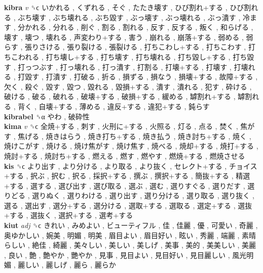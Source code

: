 \textbf{kibra} \emph{v}  ␝ϲ   いかれる ,  くずれる ,  そぐ ,  たたき壊す ,  ひび割れ+する ,  ひび割れる ,  ぶち壊す ,  ぶち壊れる ,  ぶち毀す ,  ぶっ壊す ,  ぶっ壊れる ,  ぶっ潰す ,  冷ます ,  分かれる ,  分れる ,  削ぐ ,  割る ,  割れる ,  反す ,  反する ,  叛く ,  和らげる ,  壊す ,  壊つ ,  壊れる ,  声変わり+する ,  害う ,  崩れる ,  崩落+する ,  弱める ,  弱らす ,  張りさける ,  張り裂ける ,  張裂ける ,  打ちこわし+する ,  打ちこわす ,  打ちこわれる ,  打ち壊し+する ,  打ち壊す ,  打ち壊れる ,  打ち毀し+する ,  打ち毀す ,  打っつぶす ,  打っ壊れる ,  打っ潰す ,  打割る ,  打壊+する ,  打壊す ,  打壊れる ,  打毀す ,  打潰す ,  打破る ,  折る ,  損ずる ,  損なう ,  損壊+する ,  故障+する ,  欠く ,  殺ぐ ,  毀す ,  毀つ ,  毀れる ,  毀損+する ,  潰す ,  潰れる ,  犯す ,  砕ける ,  破ける ,  破る ,  破れる ,  破壊+する ,  破損+する ,  緩める ,  罅割れ+する ,  罅割れる ,  背く ,  自壊+する ,  薄める ,  違反+する ,  違犯+する ,  鈍らす   \\
\textbf{kibrabel} ␝α   やわ ,  破砕性   \\
\textbf{kima} \emph{v}  ␝ϲ   全焼+する ,  刺す ,  火刑に+する ,  火照る ,  灯る ,  点る ,  焚く ,  焦がす ,  焦げる ,  焼きはらう ,  焼き打ち+する ,  焼き払う ,  焼き討ち+する ,  焼く ,  焼けこがす ,  焼ける ,  焼け焦がす ,  焼け焦す ,  焼べる ,  焼却+する ,  焼打+する ,  焼討+する ,  焼討ち+する ,  燃える ,  燃す ,  燃やす ,  燃焼+する ,  燃焼させる   \\
\textbf{kis} ␝ϲ   より出す ,  より分ける ,  より取る ,  より抜く ,  セレクト+する ,  チョイス+する ,  択ぶ ,  択む ,  択る ,  採択+する ,  撰ぶ ,  撰択+する ,  簡抜+する ,  精選+する ,  選する ,  選び出す ,  選び取る ,  選ぶ ,  選む ,  選りすぐる ,  選りだす ,  選りどる ,  選りぬく ,  選りわける ,  選り出す ,  選り分ける ,  選り取る ,  選り抜く ,  選る ,  選出す ,  選分+する ,  選分ける ,  選取+する ,  選取る ,  選定+する ,  選抜+する ,  選抜く ,  選択+する ,  選考+する   \\
\textbf{kiut} \emph{adj}  ␝ϲ   きれい ,  みめよい ,  ビューティフル ,  佳 ,  佳麗 ,  優 ,  可愛い ,  奇麗 ,  奥ゆかしい ,  婉美 ,  明媚 ,  明美 ,  眉目よい ,  眉目好い ,  眩い ,  秀麗 ,  端麗 ,  素晴らしい ,  絶佳 ,  綺麗 ,  美々しい ,  美しい ,  美しげ ,  美事 ,  美的 ,  美美しい ,  美麗 ,  良い ,  艶 ,  艶やか ,  艷やか ,  見事 ,  見目よい ,  見目好い ,  見目麗しい ,  風光明媚 ,  麗しい ,  麗しげ ,  麗ら ,  麗らか   \\
